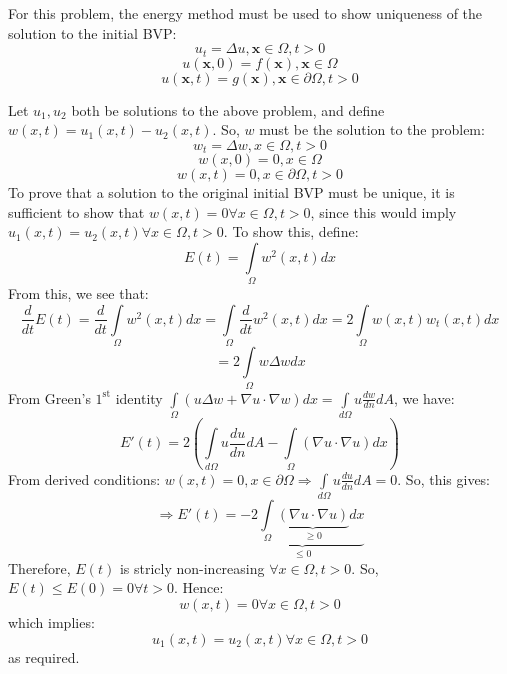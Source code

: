 \begin{homeworkProblem}

For this problem, the energy method must be used to show uniqueness of the solution to the initial BVP:
\[
u_t  = \Delta u,\mathbf{x} \in \Omega ,t > 0
\]
\[
u\left( {\mathbf{x},0} \right) = f\left( \mathbf{x} \right),\mathbf{x} \in \Omega 
\]
\[
u\left( {\mathbf{x},t} \right) = g\left( \mathbf{x} \right),\mathbf{x} \in \partial \Omega ,t > 0
\]

Let $u_1,u_2$ both be solutions to the above problem, and define $w\left( {x,t} \right) = {u_1}\left( {x,t} \right) - {u_2}\left( {x,t} \right)$. So, $w$ must be the solution to the problem:
\[{w_t} = \Delta w,x \in \Omega ,t > 0\]
\[w\left( {x,0} \right) = 0,x \in \Omega \]
\[w\left( {x,t} \right) = 0,x \in \partial \Omega ,t > 0\]
To prove that a solution to the original initial BVP must be unique, it is sufficient to show that $w\left( {x,t} \right) = 0\forall x \in \Omega ,t > 0$, since this would imply ${u_1}\left( {x,t} \right) = {u_2}\left( {x,t} \right)\forall x \in \Omega ,t > 0$. To show this, define:
\[E\left( t \right) = \int\limits_\Omega  {{w^2}\left( {x,t} \right)dx} \]
From this, we see that:
\[\frac{d}{{dt}}E\left( t \right) = \frac{d}{{dt}}\int\limits_\Omega  {{w^2}\left( {x,t} \right)dx}  = \int\limits_\Omega  {\frac{d}{{dt}}{w^2}\left( {x,t} \right)dx}  = 2\int\limits_\Omega  {w\left( {x,t} \right){w_t}\left( {x,t} \right)dx} \]
\[ = 2\int\limits_\Omega  {w\Delta wdx} \]
From Green's $1^{\textrm{st}}$ identity $\int\limits_\Omega  {\left( {u\Delta w + \nabla u \cdot \nabla w} \right)dx}  = \int\limits_{d\Omega } {u\frac{{dw}}{{dn}}dA}$, we have:
\[E'\left( t \right) = 2\left( {\int\limits_{d\Omega } {u\frac{{du}}{{dn}}dA}  - \int\limits_\Omega  {\left( {\nabla u \cdot \nabla u} \right)dx} } \right)\]
From derived conditions: $w\left( {x,t} \right) = 0,x \in \partial \Omega  \Rightarrow \int\limits_{d\Omega } {u\frac{{du}}{{dn}}dA}  = 0$. So, this gives:
\[ \Rightarrow E'\left( t \right) = \underbrace { - 2\int\limits_\Omega  {\underbrace {\left( {\nabla u \cdot \nabla u} \right)}_{ \geqslant 0}dx} }_{ \leqslant 0}\]
Therefore, $E(t)$ is stricly non-increasing $\forall x \in \Omega ,t > 0$. So, $E\left( t \right) \leqslant E\left( 0 \right)=0\forall t>0$. Hence:
 \[w\left( {x,t} \right) = 0\forall x \in \Omega ,t > 0\]
 which implies:
 \[{u_1}\left( {x,t} \right) = {u_2}\left( {x,t} \right)\forall x \in \Omega ,t > 0\]
 as required.
 \vspace{8in}
\end{homeworkProblem}
